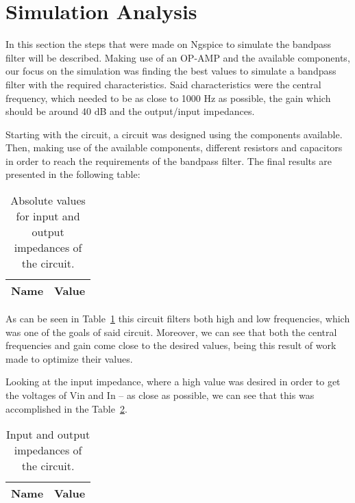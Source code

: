 \section{Simulation Analysis}
\label{sec:simulation}
\tab In this section the steps that were made on Ngspice to simulate the bandpass filter will be described. Making use of an OP-AMP and the available components, our focus on the simulation was finding the best values to simulate a bandpass filter with the required characteristics. Said characteristics were the central frequency, which needed to be as close to 1000 Hz as possible, the gain which should be around 40 dB and the output/input impedances. 

Starting with the circuit, a circuit was designed using the components available. Then, making use of the available components, different resistors and capacitors in order to reach the requirements of the bandpass filter. The final results are presented in the following table:

\begin{table}[H]
    \centering
    \begin{tabular}{|l|r|}
    \hline
    {\bf Name} & {\bf Value} \\ \hline
   
    \end{tabular}
    \caption{Absolute values for input and output impedances of the circuit.}
    \label{tab:spice1}
\end{table}
 
As can be seen in Table~\ref{tab:spice1} this circuit filters both high and low frequencies, which was one of the goals of said circuit. Moreover, we can see that both the central frequencies and gain come close to the desired values, being this result of work made to optimize their values. 

Looking at the input impedance, where a high value was desired in order to get the voltages of Vin and In – as close as possible, we can see that this was accomplished in the Table~\ref{tab:spice2}.

\begin{table}[H]
    \centering
    \begin{tabular}{|l|r|}
    \hline
    {\bf Name} & {\bf Value} \\ \hline
   
   
    \end{tabular}
    \caption{Input and output impedances of the circuit.}
    \label{tab:spice2}
\end{table}

